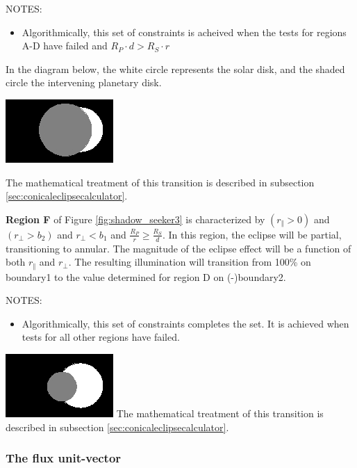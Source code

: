    NOTES:
   \begin{itemize}
    \item Algorithmically, this set of constraints is acheived when the tests
          for regions A-D have failed and $R_P \cdot d > R_S \cdot r$
   \end{itemize}

   In the diagram below, the white circle
   represents the solar disk, and the shaded circle the intervening planetary disk.

   \includegraphics{figs/shadow/shadow_seeker_fig9.jpg}

   The mathematical treatment of this transition is described in
   subsection \ref{sec:conicaleclipsecalculator}.

   \bigskip

   \textbf{Region F} of Figure \ref{fig:shadow_seeker3} is characterized by
   $(r_\Vert>0)$ and $(r_\bot>b_{2})$ and $r_\bot<b_{1}$ and
   $\frac{R_P}{r} \geqslant \frac{R_S}{d}$.
   In this
   region, the eclipse will be partial, transitioning to annular.  The magnitude of
   the eclipse effect will be a function of both $r_\Vert$ and $r_\bot$.  The
   resulting illumination will transition from 100\% on
   boundary1 to the value determined for region D on (-)boundary2.

   NOTES:
   \begin{itemize}
    \item Algorithmically, this set of constraints completes the set.  It is
          achieved when tests for all other regions have failed.
   \end{itemize}


   \includegraphics{figs/shadow/shadow_seeker_fig10.jpg}
   The mathematical treatment of this transition is described in
   subsection \ref{sec:conicaleclipsecalculator}.

   \bigskip

   \subsubsection{The flux unit{}-vector}\bigskip

